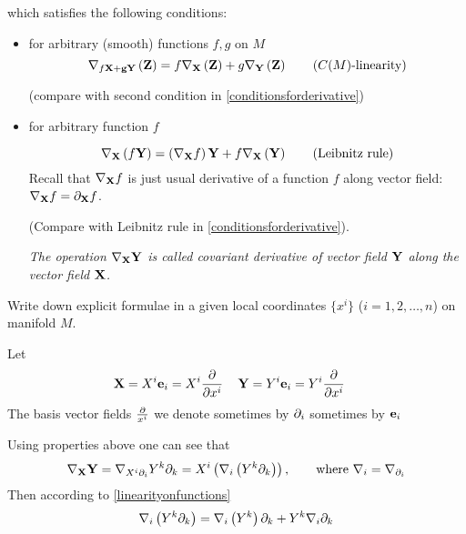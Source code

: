\documentclass[12pt]{article}
\theoremstyle{theorem}
\numberwithin{equation}{section}
\begin{document}
\noindent which satisfies the following conditions:


\begin{itemize}

\item

for arbitrary (smooth) functions $f,g$ on $M$
\begin{equation}\label{linearityonfunctions}
  \nabla_{f\bf X+g\bf Y}\left({\bf Z}\right)=
   f\nabla_{\bf X}\left({\bf Z}\right)+
   g\nabla_{\bf Y}\left({\bf Z}\right)\qquad
   \hbox {($C(M)$-linearity)}
\end{equation}


(compare with second condition in \eqref{conditionsforderivative})

\item
for arbitrary function $f$


\begin{equation}\label{leibnitzrule}
  \nabla_{\bf X} \left( f\bf Y \right)=
   \left(\nabla_{\bf X}f\right){\bf Y}+
   f\nabla_{\bf X}\left({\bf Y}\right)\qquad
   \hbox {(Leibnitz rule)}
\end{equation}
Recall that $\nabla_{\bf X} f$ is just usual derivative of a function $f$ along vector field:
$\nabla_{\bf X} f=\partial_{\bf X} f$.

(Compare with Leibnitz rule in \eqref{conditionsforderivative}).



{\it The operation $\nabla_{\bf X}{\bf Y}$ is called  covariant derivative
of vector field ${\bf Y}$ along the vector field ${\bf X}$.}


\end{itemize}



  Write down explicit formulae in a given local coordinates $\{x^i\}$ ($i=1,2,\dots,n$) on manifold $M$.

Let
         $$
      {\bf X}=X^i{\bf e}_i=X^i{\partial\over \partial x^i}\,\quad {\bf Y}=Y^i{\bf e}_i=Y^i{\partial\over \partial x^i}\,\quad
         $$
The basis vector fields ${\partial\over x^i}$ we denote sometimes by $\partial_i$ sometimes by ${\bf e}_i$


  Using properties above one can see that
\begin{equation}\label{explicitexpression}
  \nabla_{\bf X}{\bf Y}=\nabla_{X^i\partial_i}{Y^k \partial_k}
  =X^i\left(\nabla_i\left(Y^k\partial_k\right)\right),\qquad
  \hbox{where $\nabla_i=\nabla_{\partial_i}$}
\end{equation}
Then  according to \eqref{linearityonfunctions}
                 $$
           \nabla_i
            \left(
             Y^k \partial_k
            \right)=
              \nabla_i
              \left(Y^k\right)\partial_k+
            Y^k \nabla_i \partial_k
                   $$
\end{document}
